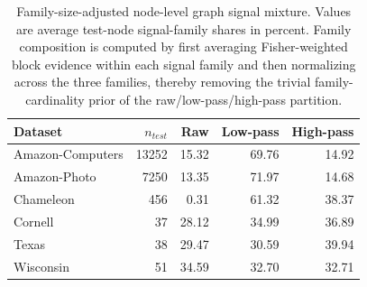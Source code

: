\begin{table}[t]
\centering
\small
\caption{Family-size-adjusted node-level graph signal mixture. Values are average test-node signal-family shares in percent. Family composition is computed by first averaging Fisher-weighted block evidence within each signal family and then normalizing across the three families, thereby removing the trivial family-cardinality prior of the raw/low-pass/high-pass partition.}
\label{tab:signal-mix}
\begin{tabular}{lrrrr}
\toprule
Dataset & $n_{test}$ & Raw & Low-pass & High-pass \\
\midrule
Amazon-Computers & 13252 & 15.32 & 69.76 & 14.92 \\
Amazon-Photo & 7250 & 13.35 & 71.97 & 14.68 \\
Chameleon & 456 & 0.31 & 61.32 & 38.37 \\
Cornell & 37 & 28.12 & 34.99 & 36.89 \\
Texas & 38 & 29.47 & 30.59 & 39.94 \\
Wisconsin & 51 & 34.59 & 32.70 & 32.71 \\
\bottomrule
\end{tabular}
\end{table}
